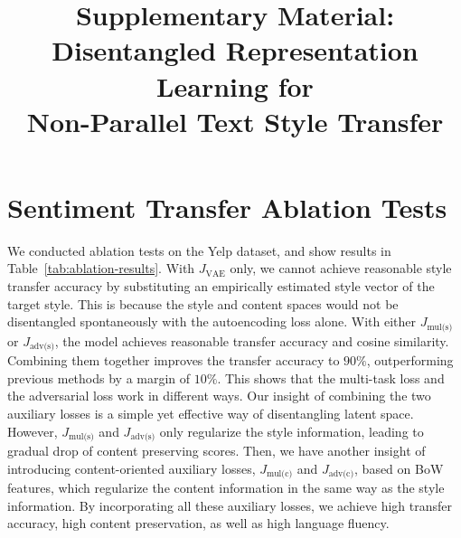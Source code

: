 \documentclass[letterpaper]{article}
\title{Supplementary Material:\\Disentangled Representation Learning for\\Non-Parallel Text Style Transfer}
\date{}
\author{}
\begin{document}
\maketitle
\graphicspath{{images/}}

\newcommand{\tabh}[1]{\multicolumn{1}{c|}{\textbf{#1}}}
\newcommand{\tabc}[2]{\multicolumn{1}{|c||}{\multirow{#1}{*}{\textbf{#2}}}}
\newcommand{\loss}[1]{J_{\text{#1}}}

\renewcommand\thesection{\Alph{section}}

\section{Sentiment Transfer Ablation Tests}
We conducted ablation tests on the Yelp dataset, and show results in Table~\ref{tab:ablation-results}.
With $\loss{VAE}$ only, we cannot achieve reasonable style transfer accuracy by substituting an empirically estimated style vector of the target style.
This is because the style and content spaces would not be disentangled spontaneously with the autoencoding loss alone.
With either $\loss{mul(s)}$ or $\loss{adv(s)}$, the model achieves reasonable transfer accuracy and cosine similarity.
Combining them together improves the transfer accuracy to $90\%$, outperforming previous methods by a margin of $10\%$.
This shows that the multi-task loss and the adversarial loss work in different ways.
Our insight of combining the two auxiliary losses is a simple yet effective way of disentangling latent space.
However, $\loss{mul(s)}$ and $\loss{adv(s)}$ only regularize the style information, leading to gradual drop of content preserving scores.
Then, we have another insight of introducing content-oriented auxiliary losses, $\loss{mul(c)}$ and $\loss{adv(c)}$, based on BoW features, which regularize the content information in the same way as the style information.
By incorporating all these auxiliary losses, we achieve high transfer accuracy, high content preservation, as well as high language fluency.
\end{document}
